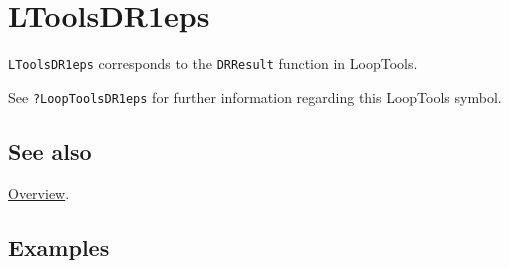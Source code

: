 \documentclass[../FeynHelpersManual.tex]{subfiles}
\begin{document}
\hypertarget{ltoolsdr1eps}{
\section{LToolsDR1eps}\label{ltoolsdr1eps}}

\texttt{LToolsDR1eps} corresponds to the \texttt{DRResult} function in
LoopTools.

See \texttt{?LoopTools\textasciigrave DR1eps} for further information
regarding this LoopTools symbol.

\subsection{See also}

\hyperlink{toc}{Overview}.

\subsection{Examples}
\end{document}
